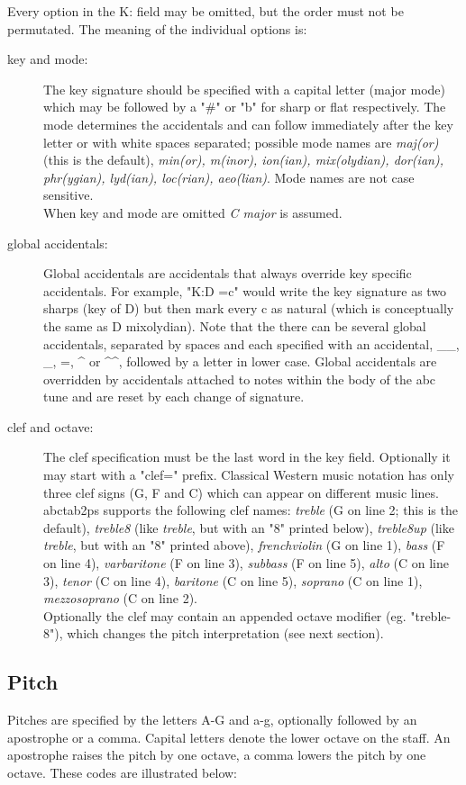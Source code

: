 \documentclass[a4paper]{article}
\begin{document}
Every option in the K: field may be omitted, but the order must not
be permutated. The meaning of the individual options is:
\begin{description}
\item[key and mode:]
The key signature should be  specified  with  a 
capital letter (major mode) which  may  be  followed  by  
a  "\#" or "b" for sharp or flat respectively. The mode determines
the accidentals and can follow immediately after the key letter
or with white spaces separated; possible mode names are 
{\it maj(or)} (this is the default), {\it min(or), m(inor), ion(ian),
mix(olydian), dor(ian), phr(ygian), lyd(ian), loc(rian), aeo(lian)}.
Mode names are not case sensitive.\\
When key and mode are omitted {\it C major} is assumed.
\item[global accidentals:]
Global accidentals are accidentals that
always override key specific accidentals. For  example, "K:D =c"
would write the key signature as two sharps (key of D) but then mark
every c as natural  (which  is
conceptually  the same as D mixolydian).  Note that the there can
be several global  accidentals,  separated  by  spaces  and  each
specified  with  an  accidental, \_\_,  \_, =, \^{ } or \^{ }\^{ }, 
followed by a  letter  in  lower  case.  Global  accidentals  are
overridden  by  accidentals  attached to notes within the body of
the abc tune and are reset by each change of signature.
\item[clef and octave:]
The clef specification must be the last word
in the key field. Optionally it may start with a "clef=" prefix.
Classical Western music notation has only three clef signs (G, F
and C) which can appear on different music lines. abctab2ps supports
the following clef names: {\it treble} (G on line 2; this
is the default), {\it treble8} (like {\it treble}, but with an "8" 
printed below), {\it treble8up} (like {\it treble}, but with an "8" 
printed above), {\it frenchviolin} (G on line 1), {\it bass} (F on line 4),
{\it varbaritone} (F on line 3), {\it subbass} (F on line 5),
{\it alto} (C on line 3), {\it tenor} (C on line 4), 
{\it baritone} (C on line 5), {\it soprano} (C on line 1), 
{\it mezzosoprano} (C on line 2).\\
Optionally the clef may contain an appended octave modifier 
(eg. "treble-8"), which changes the pitch interpretation (see next section).
\end{description}


\subsection{Pitch}
Pitches are specified by the letters A-G and a-g, optionally followed
by an apostrophe or a comma. Capital letters denote the lower octave
on the staff. An apostrophe raises the pitch by one octave, a comma
lowers the pitch by one octave. These codes are illustrated below:
\end{document}
